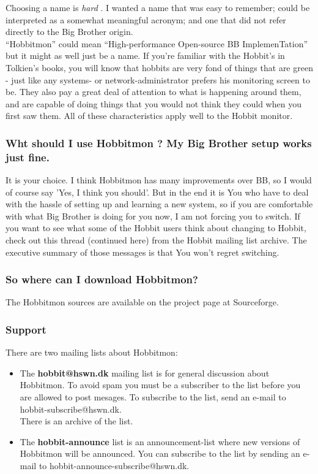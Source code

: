  Choosing a name is \emph{hard}
. I wanted a name that was easy to remember; could be interpreted as a somewhat meaningful acronym; and one that did not refer directly to the Big Brother origin.\\ 
 ``Hobbitmon'' could mean ``High-performance Open-source BB ImplemenTation'' but it might as well just be a name. If you're familiar with the Hobbit's in Tolkien's books, you will know that hobbits are very fond of things that are green - just like any systems- or network-administrator prefers his monitoring screen to be. They also pay a great deal of attention to what is happening around them, and are capable of doing things that you would not think they could when you first saw them. All of these characteristics apply well to the Hobbit monitor. 
\subsubsection{Wht should I use Hobbitmon ? My Big Brother setup works just fine.}


 It is your choice. I think Hobbitmon has many improvements over BB, so I would of course say 'Yes, I think you should'. But in the end it is You who have to deal with the hassle of setting up and learning a new system, so if you are comfortable with what Big Brother is doing for you now, I am not forcing you to switch. If you want to see what some of the Hobbit users think about changing to Hobbit, check out this thread (continued here) from the Hobbit mailing list archive. The executive summary of those messages is that You won't regret switching.
\subsubsection{So where can I download Hobbitmon?}


 The Hobbitmon sources are available on the project page at Sourceforge.
\subsubsection{Support}


 There are two mailing lists about Hobbitmon: \begin{itemize}
\item The \textbf{hobbit@hswn.dk}
 mailing list is for general discussion about Hobbitmon. To avoid spam you must be a subscriber to the list before you are allowed to post mesages. To subscribe to the list, send an e-mail to hobbit-subscribe@hswn.dk.\\ 
 There is an archive of the list.
\item The \textbf{hobbit-announce}
 list is an announcement-list where new versions of Hobbitmon will be announced. You can subscribe to the list by sending an e-mail to hobbit-announce-subscribe@hswn.dk.

\end{itemize}



